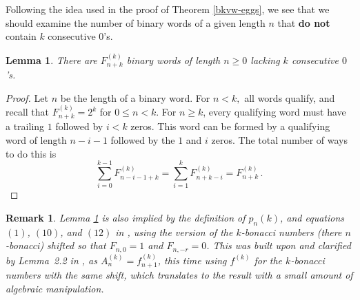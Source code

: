 \documentclass[12pt]{amsart}
\newtheorem{lemma}[theorem]{Lemma}
\newtheorem{remark}[theorem]{Remark}
\theoremstyle{definition}
\theoremstyle{theorem}
\begin{document}
Following the idea used in the proof of Theorem \ref{bkvw-eggs}, 
we see that we should examine the number of binary words of a
given length $n$ that \textbf{do not} contain $k$ consecutive $0$'s.

\begin{lemma} \label{consecutive}
There are $F^{(k)}_{n+k}$ binary words of length $n \geq 0$ lacking $k$ consecutive $0$'s.
\end{lemma}


\begin{proof}
Let $n$ be the length of a binary word. For $n<k,$ all words qualify, and recall that $F^{(k)}_{n+k} = 2^k$ for $0 \leq n<k$. For $n \geq k$, every qualifying word must have a trailing $1$ followed by $i<k$ zeros. This word can be formed by a qualifying word of length $n-i-1$ followed by the $1$ and $i$ zeros. The total number of ways to do this is
\[
\sum_{i=0}^{k-1} F^{(k)}_{n-i-1+k} = \sum_{i=1}^{k} F^{(k)}_{n+k-i} = F^{(k)}_{n+k}
\,.
\]
\end{proof}

\begin{remark}
Lemma \ref{consecutive}  is also implied by the definition of $p_n(k)$, and equations $(1)$, $(10)$, and $(12)$ in \cite{Shane:1973:FPF}, using the version of the $k$-bonacci numbers (there $n$-bonacci) shifted so that $F_{n,0}=1$ and $F_{n,-r}=0$. 
This was built upon and clarified by \mbox{Lemma 2.2} in \cite{Philippou:1982:WTC}, as $A_n^{(k)}=f^{(k)}_{n+1}$, this time using $f^{(k)}$ for the $k$-bonacci numbers with the same shift, which translates to the result with a small amount of algebraic manipulation.
\end{remark}
\end{document}
